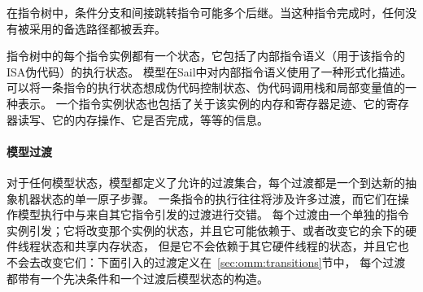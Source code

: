 在指令树中，条件分支和间接跳转指令可能多个后继。当这种指令完成时，任何没有被采用的备选路径都被丢弃。

指令树中的每个指令实例都有一个状态，它包括了内部指令语义（用于该指令的ISA伪代码）的执行状态。
模型在Sail中对内部指令语义使用了一种形式化描述。可以将一条指令的执行状态想成伪代码控制状态、伪代码调用栈和局部变量值的一种表示。
一个指令实例状态也包括了关于该实例的内存和寄存器足迹、它的寄存器读写、它的内存操作、它是否完成，等等的信息。

\paragraph{模型过渡}
对于任何模型状态，模型都定义了允许的过渡集合，每个过渡都是一个到达新的抽象机器状态的单一原子步骤。
一条指令的执行往往将涉及许多过渡，而它们在操作模型执行中与来自其它指令引发的过渡进行交错。
每个过渡由一个单独的指令实例引发；它将改变那个实例的状态，并且它可能依赖于、或者改变它的余下的硬件线程状态和共享内存状态，
但是它不会依赖于其它硬件线程的状态，并且它也不会去改变它们：下面引入的过渡定义在~\ref{sec:omm:transitions}节中，
每个过渡都带有一个先决条件和一个过渡后模型状态的构造。

